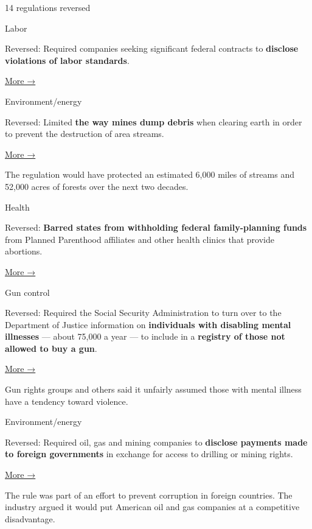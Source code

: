 14 regulations reversed

Labor

Reversed: Required companies seeking significant federal contracts to
\textbf{disclose violations of labor standards}.

\href{https://www.nytimes3xbfgragh.onion/2017/03/13/business/us-worker-safety-rules-osha.html}{More
→}

Environment/energy

Reversed: Limited \textbf{the way mines dump debris} when clearing earth
in order to prevent the destruction of area streams.

\href{https://www.nytimes3xbfgragh.onion/2017/02/02/business/energy-environment/senate-coal-regulations.html}{More
→}

The regulation would have protected an estimated 6,000 miles of streams
and 52,000 acres of forests over the next two decades.

Health

Reversed: \textbf{Barred states from withholding federal family-planning
funds} from Planned Parenthood affiliates and other health clinics that
provide abortions.

\href{https://www.nytimes3xbfgragh.onion/2016/12/14/us/politics/obama-administration-planned-parenthood.html}{More
→}

Gun control

Reversed: Required the Social Security Administration to turn over to
the Department of Justice information on \textbf{individuals with
disabling mental illnesses} --- about 75,000 a year --- to include in a
\textbf{registry of those not allowed to buy a gun}.

\href{https://www.nytimes3xbfgragh.onion/2017/03/05/us/politics/trump-deregulation-guns-wall-st-climate.html}{More
→}

Gun rights groups and others said it unfairly assumed those with mental
illness have a tendency toward violence.

Environment/energy

Reversed: Required oil, gas and mining companies to \textbf{disclose
payments made to foreign governments} in exchange for access to drilling
or mining rights.

\href{https://www.nytimes3xbfgragh.onion/2017/02/04/us/politics/republicans-oil-gas-regulations.html}{More
→}

The rule was part of an effort to prevent corruption in foreign
countries. The industry argued it would put American oil and gas
companies at a competitive disadvantage.

